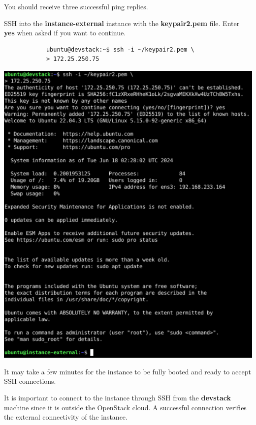 \documentclass[letterpaper, 12pt]{article}
\begin{document}
\begin{enumerate}
    \begin{notebox}
        You should receive three successful ping replies.
    \end{notebox}

    \begin{labstep}
        SSH into the \textbf{instance-external} instance with the \textbf{keypair2.pem} file.
        Enter \textbf{yes} when asked if you want to continue.
        \begin{lstlisting}
            ubuntu@devstack:~$ ssh -i ~/keypair2.pem \
            > 172.25.250.75
        \end{lstlisting}

        \begin{center}
            \includegraphics[width=\linewidth]{images/part6/step10.png}
        \end{center}
    \end{labstep}

    \begin{notebox}
        It may take a few minutes for the instance to be fully booted and ready to accept SSH connections.
    \end{notebox}
    \begin{notebox}
        It is important to connect to the instance through SSH from the \textbf{devstack} machine since it is outside the OpenStack cloud.
        A successful connection verifies the external connectivity of the instance.
    \end{notebox}


\end{enumerate}
\end{document}
